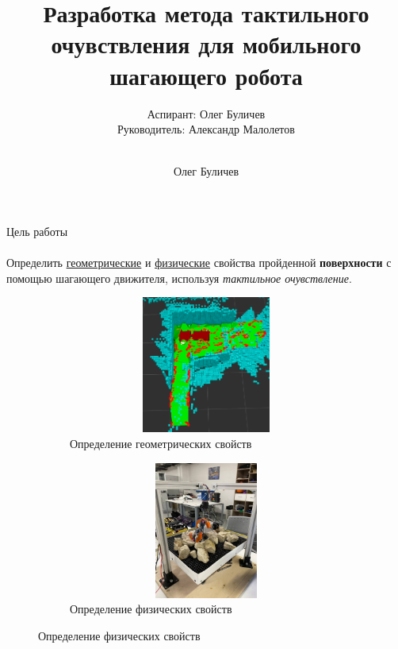 \documentclass[aspectratio=169,xcolor=table]{beamer}
\title[]{Разработка метода тактильного очувствления для мобильного шагающего робота} %
\subtitle{Аспирант: Олег Буличев \\ Руководитель: Александр Малолетов \\ \ } %
\author{Олег Буличев}
\newcommand{\fbckg}[1]{\usebackgroundtemplate{\texttt{[image: \#1]}}}%
\begin{document}
\setlength{\abovedisplayskip}{0pt}
\setlength{\belowdisplayskip}{0pt}
\setlength{\abovedisplayshortskip}{0pt}
\setlength{\belowdisplayshortskip}{0pt}

\fbckg{fibeamer/figs/title_page.png}

\fbckg{fibeamer/figs/common.png}

\begin{frame}[t]{Цель работы}
\framesubtitle{}
\vspace{-0.4cm}
    Определить \underline{геометрические} и \underline{физические} свойства пройденной \textbf{поверхности} с помощью шагающего движителя, используя \textit{тактильное очувствление}.

\begin{figure}[H]
    \begin{subfigure}{0.49\textwidth}
        \centering\includegraphics[height=4.5cm,width=1\textwidth,keepaspectratio]{conv_concave.png}
        \caption*{Определение геометрических свойств}
    \end{subfigure}
    \begin{subfigure}{0.49\textwidth}
        \centering\includegraphics[height=4.5cm,width=1\textwidth,keepaspectratio]{s_shape_leg/view.jpg}
        \caption*{Определение физических свойств}
        \label{fig:s_shape_leg/view.jpg}
    \end{subfigure}
\end{figure}

\end{frame}
\end{document}
